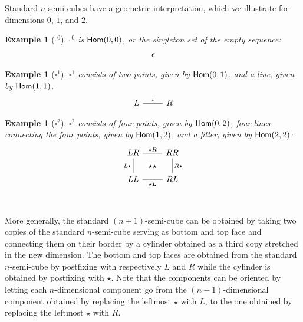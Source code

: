 \documentclass{msc}
\newcommand{\Cube}{\ensuremath{\boldsymbol{{\square}}}}
\newtheorem{example}[therm]{Example}
\newcommand{\kstar}{{\star}}
\begin{document}
Standard $n$-semi-cubes have a geometric interpretation, which we illustrate for dimensions $0$, $1$, and $2$.

\begin{example}[$\Cube^0$]
  $\Cube^0$ is $\mathsf{Hom}(0, 0)$, or the singleton set of the empty sequence:
  \begin{equation*}
    \begin{tikzcd}
      \epsilon
    \end{tikzcd}
  \end{equation*}
\end{example}

\begin{example}[$\Cube^1$]
  $\Cube^1$ consists of two points, given by $\mathsf{Hom}(0, 1)$, and a line, given by $\mathsf{Hom}(1, 1)$.
  \begin{equation*}
    \begin{tikzcd}
      L \arrow[r, "\kstar", dash] & R
    \end{tikzcd}
  \end{equation*}
\end{example}

\begin{example}[$\Cube^2$]
  $\Cube^2$ consists of four points, given by $\mathsf{Hom}(0, 2)$, four lines connecting the four points, given by $\mathsf{Hom}(1, 2)$, and a filler, given by $\mathsf{Hom}(2, 2)$:
  \begin{equation*}
    \begin{tikzcd}
      LR \arrow[r, dash, "\kstar R"{name=F}] \arrow[d, dash, "L\kstar" left] & RR \arrow[d, dash, "R\kstar"] \\
      LL \arrow[r, dash, "\kstar L"{name=T, below}] & RL \\
      \arrow[rightarrow, from=F, to=T, phantom, "\kstar\kstar" description]
    \end{tikzcd}
  \end{equation*}
\end{example}

More generally, the standard $(n + 1)$-semi-cube can be obtained by taking two copies of the standard $n$-semi-cube serving as bottom and top face and connecting them on their border by a cylinder obtained as a third copy stretched in the new dimension. The bottom and top faces are obtained from the standard $n$-semi-cube by postfixing with respectively $L$ and $R$ while the cylinder is obtained by postfixing with $\kstar$. Note that the components can be oriented by letting each $n$-dimensional component go from the $(n-1)$-dimensional component obtained by replacing the leftmost $\kstar$ with $L$, to the one obtained by replacing the leftmost $\kstar$ with $R$.
\end{document}
